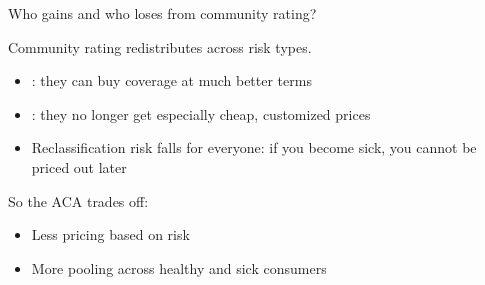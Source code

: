 \begin{frame}{Who gains and who loses from community rating?}

    Community rating redistributes across risk types.
    \begin{itemize}
        \item {}: they can buy coverage at much better terms
        \item {}: they no longer get especially cheap, customized prices
        \item Reclassification risk falls for everyone: if you become sick, you cannot be priced out later
    \end{itemize}

    \vspace{3mm}

    So the ACA trades off:
    \begin{itemize}
        \item Less pricing based on risk
        \item More pooling across healthy and sick consumers
    \end{itemize}

\end{frame}
